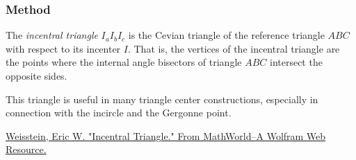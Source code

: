 \vspace{1em}

\begin{tkzexample}[latex=8cm]
\end{tkzexample}

\subsubsection{Method }
\label{ssub:method_incentral}

The \emph{incentral triangle} $I_aI_bI_c$ is the Cevian triangle of the reference triangle $ABC$ with respect to its incenter $I$. That is, the vertices of the incentral triangle are the points where the internal angle bisectors of triangle $ABC$ intersect the opposite sides.

This triangle is useful in many triangle center constructions, especially in connection with the incircle and the Gergonne point.\begin{flushright}
  \small
\href{https://mathworld.wolfram.com/IncentralTriangle.html}{Weisstein, Eric W. "Incentral Triangle." From MathWorld--A Wolfram Web Resource.}
\end{flushright}

\vspace{1em}

